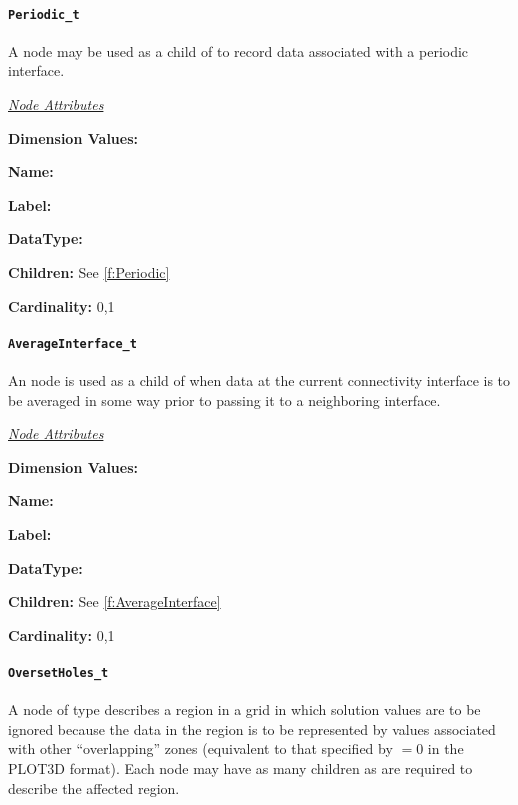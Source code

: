 \paragraph{\texttt{Periodic\_t}}

A  node may be used as a child of
 to record data associated with a
periodic interface.

\textit{\uline{Node Attributes}}
\begin{Ventryic}{\textbf{Dimension Values:}}
\item [\textbf{Name:}]
\item [\textbf{Label:}]
\item [\textbf{DataType:}]
\item [\textbf{Children:}]
      See \autoref{f:Periodic}
\item [\textbf{Cardinality:}]
      0,1
\end{Ventryic}

\paragraph{\texttt{AverageInterface\_t}}

An  node is used as a child of
 when data at the current connectivity
interface is to be averaged in some way prior to passing it to a
neighboring interface.

\textit{\uline{Node Attributes}}
\begin{Ventryic}{\textbf{Dimension Values:}}
\item [\textbf{Name:}]
\item [\textbf{Label:}]
\item [\textbf{DataType:}]
\item [\textbf{Children:}]
      See \autoref{f:AverageInterface}
\item [\textbf{Cardinality:}]
      0,1
\end{Ventryic}

\paragraph{\texttt{OversetHoles\_t}}

A node of type  describes a region in a grid in
which solution values are to be ignored because the data in the region
is to be represented by values associated with other ``overlapping''
zones (equivalent to that specified by  $= 0$ in the PLOT3D
format). Each  node may have as many
 children as are required to describe the affected
region.

